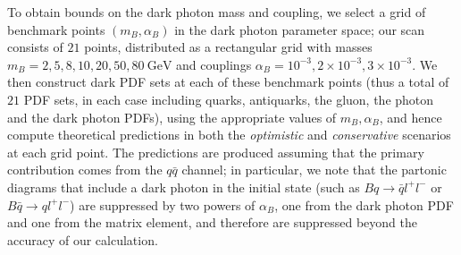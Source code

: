 \documentclass[withindex,glossary]{cam-thesis}
\begin{document}
To obtain bounds on the dark photon mass and coupling, we select a grid of benchmark
points $(m_B, \alpha_B)$ in the dark photon parameter space; our scan consists of $21$ points, distributed as a rectangular grid
with masses $m_B = 2, 5, 8, 10, 20, 50, 80\ \text{GeV}$ and couplings
$\alpha_B = 10^{-3}, 2\times10^{-3}, 3 \times 10^{-3}$. We then construct dark PDF sets at each 
of these benchmark points (thus a total of $21$ PDF sets, in each case including quarks, antiquarks, the gluon, the photon and the dark photon PDFs), using the 
appropriate values of $m_B, \alpha_B$, and hence
compute theoretical predictions in both the \textit{optimistic} and \textit{conservative} scenarios at each grid point. The predictions
are produced assuming that the primary contribution comes from the
$q\bar{q}$ channel; in particular, we note that the partonic diagrams that include a dark
photon in the initial state (such as $Bq\to \bar{q}l^+l^-$ or $B\bar{q}\to
ql^+l^-$) are suppressed by two powers of $\alpha_B$, one from the
dark photon PDF and one from the matrix element, and therefore are
suppressed beyond the accuracy of our calculation. 
\end{document}
